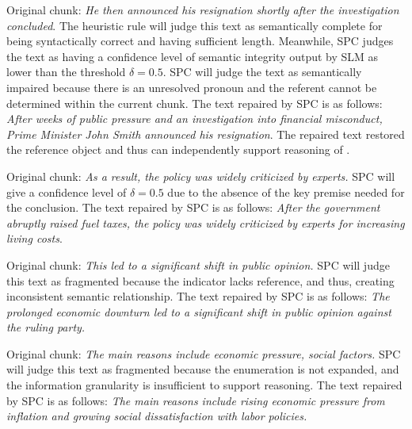 Original chunk:
\textit{He then announced his resignation shortly after the investigation concluded}. 
The heuristic rule will judge this text as semantically complete for being syntactically correct and having sufficient length.
Meanwhile, SPC judges the text as having a confidence level of semantic integrity output by SLM as lower than the threshold $\delta=0.5$.
SPC will judge the text as semantically impaired because there is an unresolved pronoun  and the referent cannot be determined within the current chunk. 
The text repaired by SPC is as follows: \textit{After weeks of public pressure and an investigation into financial misconduct, Prime Minister John Smith announced his resignation}.
The repaired text restored the reference object and thus can independently support reasoning of .


Original chunk: 
\textit{As a result, the policy was widely criticized by experts.}
SPC will give a confidence level of $\delta=0.5$ due to the absence of the key premise needed for the conclusion.
The text repaired by SPC is as follows:
\textit{After the government abruptly raised fuel taxes, the policy was widely criticized by experts for increasing living costs}.


Original chunk: 
\textit{This led to a significant shift in public opinion.}
SPC will judge this text as fragmented because the indicator  lacks reference, and thus, creating inconsistent semantic relationship.
The text repaired by SPC is as follows:
\textit{The prolonged economic downturn led to a significant shift in public opinion against the ruling party.}

Original chunk: 
\textit{The main reasons include economic pressure, social factors.}
SPC will judge this text as fragmented because the enumeration is not expanded, and the information granularity is insufficient to support reasoning.
The text repaired by SPC is as follows:
\textit{The main reasons include rising economic pressure from inflation and growing social dissatisfaction with labor policies.}

